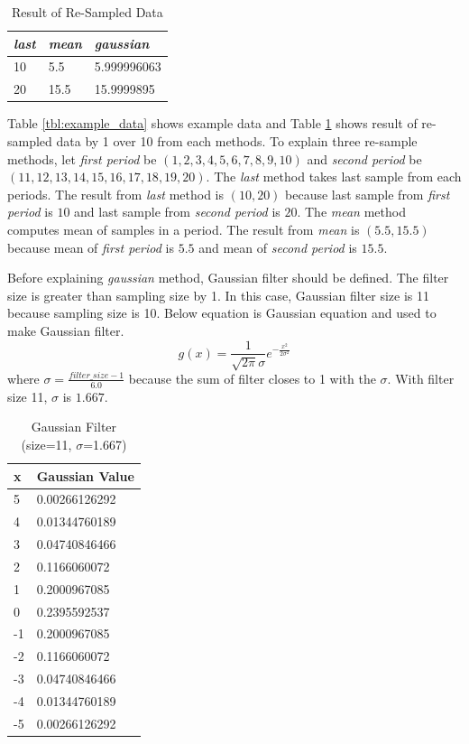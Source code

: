 \documentclass[draft,dvipsnames]{drexel-thesis}
\begin{document}
\begin{thesis}
\begin{table}[!t]
\centering
\caption{Result of Re-Sampled Data}
\label{tbl:result_resample}
\begin{tabular}{|l|l|l|}
\hline
{\em last} & {\em mean} & {\em gaussian}    \\ \hline
10   & 5.5  & 5.999996063 \\
20   & 15.5 & 15.9999895  \\ \hline
\end{tabular}
\end{table}

Table \ref{tbl:example_data} shows example data and Table \ref{tbl:result_resample} shows result of re-sampled data by 1 over 10 from each methods. To explain three re-sample methods, let {\em first period} be $(1, 2, 3, 4, 5, 6, 7, 8, 9, 10)$ and {\em second period} be $(11, 12, 13, 14, 15, 16, 17, 18, 19, 20)$. The {\em last} method takes last sample from each periods. The result from {\em last} method is $(10, 20)$ because last sample from {\em first period} is $10$ and last sample from {\em second period} is $20$. The {\em mean} method computes mean of samples in a period. The result from {\em mean} is $(5.5, 15.5)$ because mean of {\em first period} is $5.5$ and mean of {\em second period} is $15.5$.

Before explaining {\em gaussian} method, Gaussian filter should be defined. The filter size is greater than sampling size by 1. In this case, Gaussian filter size is 11 because sampling size is 10. Below equation is Gaussian equation and used to make Gaussian filter.
$$g(x) = \frac{1}{\sqrt{2\pi}\sigma}e^{-\frac{x^2}{2\sigma^2}}$$
where $\sigma = \frac{filter\_size-1}{6.0}$ because the sum of filter closes to 1 with the $\sigma$. With filter size 11, $\sigma$ is $1.667$.

\begin{table}[!t]
\centering
\caption{Gaussian Filter (size=11, $\sigma$=1.667)}
\label{tbl:gaussian_filter}
\begin{small}
\begin{tabular}{|l|l|}
\hline
x  & Gaussian Value \\ \hline
5  & 0.00266126292  \\
4  & 0.01344760189  \\
3  & 0.04740846466  \\
2  & 0.1166060072   \\
1  & 0.2000967085   \\
0  & 0.2395592537   \\
-1 & 0.2000967085   \\
-2 & 0.1166060072   \\
-3 & 0.04740846466  \\
-4 & 0.01344760189  \\
-5 & 0.00266126292  \\ \hline
\end{tabular}
\end{small}
\end{table}


\end{thesis}
\end{document}
